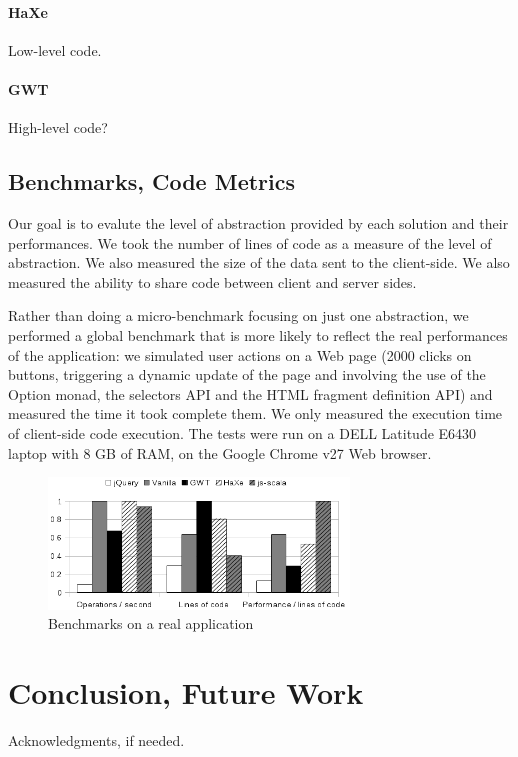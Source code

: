 \documentclass[preprint]{sigplanconf}
\begin{document}
\paragraph*{HaXe} Low-level code.

\paragraph*{GWT} High-level code?

\subsection{Benchmarks, Code Metrics}

Our goal is to evalute the level of abstraction provided by each solution and their performances. We took the
number of lines of code as a measure of the level of abstraction. We also measured the size of the data sent to the
client-side. We also measured the ability to share code between client and server sides.

Rather than doing a micro-benchmark focusing on just one abstraction, we performed a global benchmark that is more
likely to reflect the real performances of the application: we simulated user actions on a Web page (2000 clicks on
buttons, triggering a dynamic update of the page and involving the use of the Option monad, the selectors API and
the HTML fragment definition API) and measured the time it took complete them. We only measured the execution time of
client-side code execution. The tests were run on a DELL Latitude E6430 laptop with 8 GB of RAM, on the Google
Chrome v27 Web browser.

\begin{figure}
\label{benchmark}
\centering
\includegraphics[width=8cm]{chooze.png}
\caption{Benchmarks on a real application}
\end{figure}


\section{Conclusion, Future Work}
\label{discussion}

%
%
\acks

Acknowledgments, if needed.



%
%
%
\end{document}
